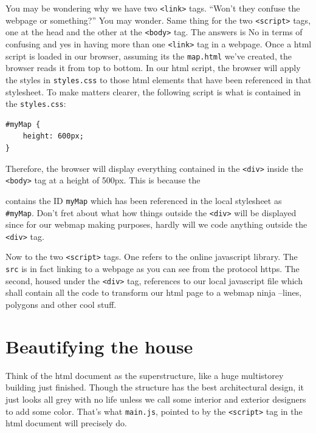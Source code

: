 \documentclass[
]{book}
\theoremstyle{definition}
\theoremstyle{definition}
\theoremstyle{definition}
\theoremstyle{definition}
\theoremstyle{remark}
\begin{document}
You may be wondering why we have two \texttt{\textless{}link\textgreater{}} tags. ``Won't they confuse the webpage or something?'' You may wonder. Same thing for the two \texttt{\textless{}script\textgreater{}} tags, one at the head and the other at the \texttt{\textless{}body\textgreater{}} tag. The answers is No in terms of confusing and yes in having more than one \texttt{\textless{}link\textgreater{}} tag in a webpage. Once a html script is loaded in our browser, assuming its the \texttt{map.html} we've created, the browser reads it from top to bottom. In our html script, the browser will apply the styles in \texttt{styles.css} to those html elements that have been referenced in that stylesheet. To make matters clearer, the following script is what is contained in the \texttt{styles.css}:

\begin{verbatim}
#myMap { 
    height: 600px; 
}
\end{verbatim}

Therefore, the browser will display everything contained in the \texttt{\textless{}div\textgreater{}} inside the \texttt{\textless{}body\textgreater{}} tag at a height of 500px. This is because the

contains the ID \texttt{myMap} which has been referenced in the local stylesheet as \texttt{\#myMap}. Don't fret about what how things outside the \texttt{\textless{}div\textgreater{}} will be displayed since for our webmap making purposes, hardly will we code anything outside the \texttt{\textless{}div\textgreater{}} tag.

Now to the two \texttt{\textless{}script\textgreater{}} tags. One refers to the online javascript library. The \texttt{src} is in fact linking to a webpage as you can see from the protocol https. The second, housed under the \texttt{\textless{}div\textgreater{}} tag, references to our local javascript file which shall contain all the code to transform our html page to a webmap ninja --lines, polygons and other cool stuff.

\hypertarget{beautifying-the-house}{%
\section{Beautifying the house}\label{beautifying-the-house}}

Think of the html document as the superstructure, like a huge multistorey building just finished. Though the structure has the best architectural design, it just looks all grey with no life unless we call some interior and exterior designers to add some color. That's what \texttt{main.js}, pointed to by the \texttt{\textless{}script\textgreater{}} tag in the html document will precisely do.
\end{document}
